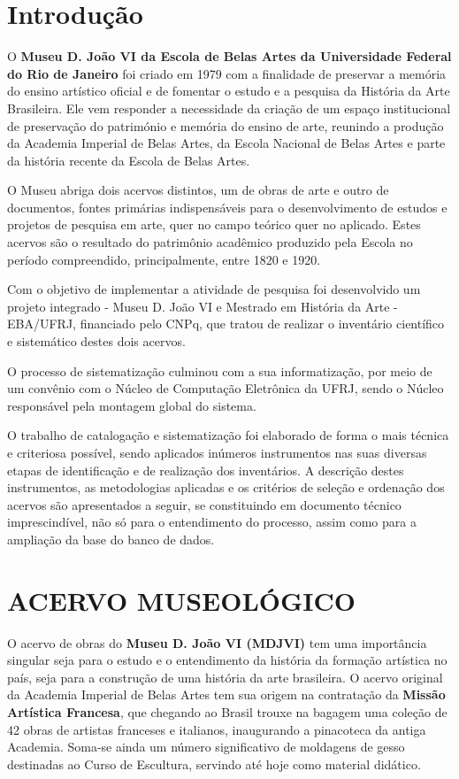 
\section{Introdução}
O \textbf{Museu D. João VI da Escola de Belas Artes da Universidade Federal do Rio de Janeiro} foi criado em 1979 com a finalidade de preservar a memória do ensino artístico oficial e de fomentar o estudo e a pesquisa da História da Arte Brasileira. Ele vem responder a necessidade da criação de um espaço institucional de preservação do património e memória do ensino de arte, reunindo a produção da Academia Imperial de Belas Artes, da Escola Nacional de Belas Artes e parte da história recente da Escola de Belas Artes.

O Museu abriga dois acervos distintos, um de obras de arte e outro de documentos, fontes primárias indispensáveis para o desenvolvimento de estudos e projetos de pesquisa em arte, quer no campo teórico quer no aplicado. Estes acervos são o resultado do patrimônio acadêmico produzido pela Escola no período compreendido, principalmente, entre 1820 e 1920.

Com o objetivo de implementar a atividade de pesquisa foi desenvolvido um projeto integrado - Museu D. João VI e Mestrado em História da Arte - EBA/UFRJ, financiado pelo CNPq, que tratou de realizar o inventário científico e sistemático destes dois acervos. 

O processo de sistematização culminou com a sua informatização, por meio de um convênio com o Núcleo de Computação Eletrônica da UFRJ, sendo o Núcleo responsável pela montagem global do sistema.

O trabalho de catalogação e sistematização foi elaborado de forma o mais técnica e criteriosa possível, sendo aplicados inúmeros instrumentos nas suas diversas etapas de identificação e de realização dos inventários. A descrição destes instrumentos, as metodologias aplicadas e os critérios de seleção e ordenação dos acervos são apresentados a seguir, se constituindo em documento técnico imprescindível, não só para o entendimento do processo, assim como para a ampliação da base do banco de dados.

\section{ACERVO MUSEOLÓGICO}
O acervo de obras do \textbf{Museu D. João VI (MDJVI)} tem uma importância singular seja para o estudo e o entendimento da história da formação artística no país, seja para a construção de uma história da arte brasileira. O acervo original da Academia Imperial de Belas Artes tem sua origem na contratação da \textbf{Missão Artística Francesa}, que chegando ao Brasil trouxe na bagagem uma coleção de 42 obras de artistas franceses e italianos, inaugurando a pinacoteca da antiga Academia. Soma-se ainda um número significativo de moldagens de gesso destinadas ao Curso de Escultura, servindo até hoje como material didático. 

